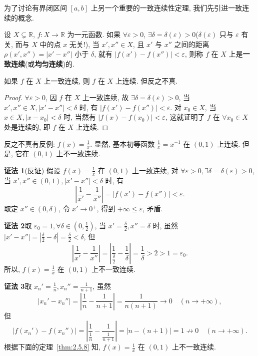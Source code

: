 为了讨论有界闭区间 $[a,b]$ 上另一个重要的一致连续性定理, 我们先引进一致连续的概念.

\begin{definition}\label{def:2.5.1}
设 $X \subsetneq \mathbb{R}$, $f\colon X \to \mathbb{R}$ 为一元函数. 如果 $\forall \varepsilon > 0$, $\exists \delta = \delta(\varepsilon) > 0$($\delta(\varepsilon)$ 只与 $\varepsilon$ 有关, 而与 $X$ 中的点 $x$ 无关!), 当 $x', x'' \in X$, 且 $x'$ 与 $x''$ 之间的距离 $\rho(x', x'') = |x' - x''|$ 小于 $\delta$, 就有 $|f(x') - f(x'')| < \varepsilon$, 则称 $f$ 在 $X$ 上是\textbf{一致连续}(或\textbf{均匀连续})的.
\end{definition}

\begin{theorem}\label{thm:2.5.4}
如果 $f$ 在 $X$ 上一致连续, 则 $f$ 在 $X$ 上连续. 但反之不真.
\end{theorem}

\begin{proof}
$\forall \varepsilon > 0$, 因 $f$ 在 $X$ 上一致连续, 故 $\exists \delta = \delta(\varepsilon) > 0$, 当 $x', x'' \in X, |x' - x''| < \delta$ 时, 有 $|f(x') - f(x'')| < \varepsilon$. 对 $x_0 \in X$, 当 $x \in X, |x - x_0| < \delta$ 时, 当然有 $|f(x) - f(x_0)| < \varepsilon$, 这就证明了 $f$ 在 $\forall x_0 \in X$ 处是连续的, 即 $f$ 在 $X$ 上连续.
\end{proof}

反之不真有反例: $f(x) = \frac{1}{x}$. 显然, 基本初等函数 $\frac{1}{x} = x^{-1}$ 在 $(0,1)$ 上连续. 但是, 它在 $(0,1)$ 上不一致连续.

\textbf{证法 1}\quad (反证) 假设 $f(x) = \frac{1}{x}$ 在 $(0,1)$ 上一致连续, 对 $\forall \varepsilon > 0, \exists \delta = \delta(\varepsilon) > 0$, 当 $x', x'' \in (0,1), |x' - x''| < \delta$ 时, 有
\[
\left|\frac{1}{x'} - \frac{1}{x''}\right| = |f(x') - f(x'')| < \varepsilon.
\]
取定 $x'' \in (0, \delta)$, 令 $x' \to 0^+$, 得到 $+\infty \leqslant \varepsilon$, 矛盾.

\textbf{证法 2}\quad 取 $\varepsilon_0 = 1, \forall \delta \in \left(0, \frac{1}{2}\right)$, 当 $x' = \frac{\delta}{2}, x'' = \delta$ 时, 虽然 $|x' - x''| = \left|\frac{\delta}{2} - \delta\right| = \frac{\delta}{2} < \delta$, 但
\[
\left|\frac{1}{x'} - \frac{1}{x''}\right| = \left|\frac{1}{\frac{\delta}{2}} - \frac{1}{\delta}\right| = \frac{1}{\delta} > 2 > 1 = \varepsilon_0.
\]
所以, $f(x) = \frac{1}{x}$ 在 $(0,1)$ 上不一致连续.

\textbf{证法 3}\quad 取 $x_n' = \frac{1}{n}, x_n'' = \frac{1}{n+1}$, 虽然
\[
|x_n' - x_n''| = \left|\frac{1}{n} - \frac{1}{n+1}\right| = \frac{1}{n(n+1)} \to 0 \quad (n \to +\infty),
\]
但
\[
|f(x_n') - f(x_n'')| = \left|\frac{1}{\frac{1}{n}} - \frac{1}{\frac{1}{n+1}}\right| = |n - (n+1)| = 1 \not\to 0 \quad (n \to +\infty).
\]
根据下面的定理~\ref{thm:2.5.8} 知, $f(x) = \frac{1}{x}$ 在 $(0,1)$ 上不一致连续.

